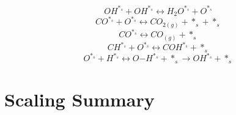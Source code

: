 \documentclass[a4paper,8pt]{report}
\begin{document}
\begin{equation}
\label{reaction_13}
OH^{*_s}+OH^{*_s} \leftrightarrow H_{2}O^{*_s}+O^{*_s}
\end{equation}
\begin{equation}
\label{reaction_14}
CO^{*_s}+O^{*_s} \leftrightarrow CO_{2(g)}+*_s+*_s
\end{equation}
\begin{equation}
\label{reaction_15}
CO^{*_s} \leftrightarrow CO_{(g)}+*_s
\end{equation}
\begin{equation}
\label{reaction_16}
CH^{*_s}+O^{*_s} \leftrightarrow COH^{*_s}+*_s
\end{equation}
\begin{equation}
\label{reaction_17}
O^{*_s}+H^{*_s} \leftrightarrow O\mathrm{-}H^{*_s}+*_s \rightarrow OH^{*_s}+*_s
\end{equation}\section{Scaling Summary}
\end{document}
